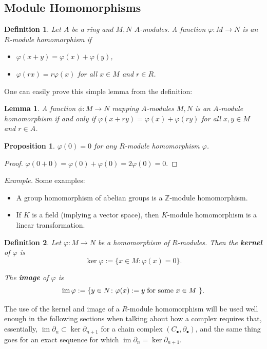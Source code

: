 \documentclass[12pt,reqno]{amsart}
\theoremstyle{plain}
\newtheorem{defi}{Definition}
\newtheorem{lemma}{Lemma}
\newtheorem{prop}{Proposition}
\DeclareMathOperator{\im}{im}
\newcommand{\zz}{\mathbb Z}
\begin{document}
\subsection{Module Homomorphisms}
\begin{defi} Let $A$ be a ring and $M, N$ $A$-modules. A function $\varphi \colon M \to N$ is an $R$-module homomorphism if
 \begin{itemize}
\item $\varphi (x+ y) = \varphi (x) + \varphi (y)$, 
\item $\varphi (rx) = r \varphi (x)$ for all $x \in M$ and $r \in R$.
\end{itemize}
\end{defi} 

One can easily prove this simple lemma from the definition: 

\begin{lemma} A function $\phi \colon M \to N$ mapping $A$-modules $M, N$ is an $A$-module homomorphism if and only if $\varphi (x+ry) = \varphi (x) + \varphi (ry)$ for all $x, y \in M$ and $r \in A$.  
\end{lemma} 
\begin{prop} $\varphi (0) = 0 $ for any $R$-module homomorphism $\varphi$.
\end{prop}
\begin{proof}
$\varphi (0 + 0) = \varphi(0) + \varphi (0) = 2 \varphi (0) = 0.$
\end{proof}


\textit{Example.} Some examples:
\begin{itemize}
\item A group homomorphism of abelian groups is a $\zz$-module homomorphism. 
\item If $K$ is a field (implying a vector space), then $K$-module homomorphism is a linear transformation.
\end{itemize}

\begin{defi}
Let $\varphi \colon M \to N$ be a homomorphism of $R$-modules. Then the \textbf{kernel} of $\varphi$ is $$ \ker \varphi := \{ x \in M \colon \varphi(x) = 0 \}. $$

The \textbf{image} of $\varphi$ is $$ \im \varphi := \{ y \in N \colon \varphi (x) := y \;  \textup{for some $x \in M$ \}}.$$
\end{defi}

The use of the kernel and image of a $R$-module homomorphism will be used well enough in the following sections when talking about how a complex requires that, essentially, $\im \partial_n \subset \ker \partial_{n+1}$ for a chain complex $(C_\bullet, \partial_\bullet)$, and the same thing goes for an exact sequence for which $\im \partial_n = \ker \partial_{n+1}$.
\end{document}
